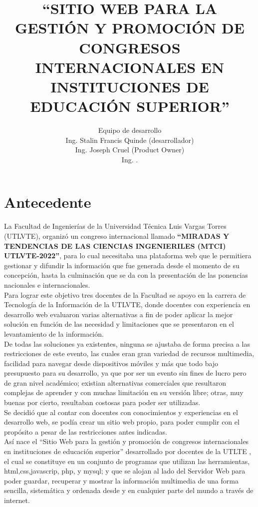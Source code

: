 \documentclass[a4paper,14px]{article}
\title{``SITIO WEB PARA LA GESTIÓN Y PROMOCIÓN DE CONGRESOS INTERNACIONALES EN INSTITUCIONES DE EDUCACIÓN SUPERIOR''}
\author{Equipo de desarrollo \\ Ing. Stalin Francis Quinde (desarrollador) \\ Ing. Joseph Cruel (Product Owner) \\ Ing. . }
\begin{document}
\maketitle

\section{Antecedente}
\label{sec:antecedente}
La Facultad de Ingenierías de la Universidad Técnica Luis Vargas Torres (UTLVTE), organizó un congreso internacional llamado \textbf{``MIRADAS Y TENDENCIAS  DE LAS CIENCIAS INGENIERILES (MTCI) UTLVTE-2022''}, para lo cual necesitaba una plataforma web que le permitiera gestionar y difundir la información que  fue generada desde el momento de su concepción, hasta la culminación que se da con la presentación de las ponencias nacionales e internacionales.\\

Para lograr este objetivo tres docentes de la Facultad se apoyo en la carrera de Tecnología de la Información de la UTLVTE, donde docentes con experiencia en desarrollo web evaluaron varias alternativas a fin de poder aplicar la mejor solución en función de las necesidad y limitaciones que se presentaron en el levantamiento de la información.\\

De todas las soluciones ya existentes, ninguna se ajustaba de forma precisa a las restricciones de este evento, las cuales eran  gran variedad de recursos multimedia, facilidad para navegar desde dispositivos móviles y  más que todo bajo presupuesto para su desarrollo, ya que por ser un evento sin fines de lucro pero de gran nivel académico; existian alternativas comerciales que resultaron complejas de aprender y con muchas limitación en su versión libre; otras, muy buenas por cierto, resultaban costosas para poder ser utilizadas.\\

Se decidió que al contar con docentes con conocimientos y experiencias en el desarrollo web,  se podía crear un  sitio web propio, para poder  cumplir con el propósito a pesar de las restricciones antes indicadas.\\

Así nace el  ``Sitio Web para la gestión y promoción de congresos internacionales en instituciones de educación superior'' desarrollado por docentes de la UTLTE , el cual se constituye en un  conjunto de programas que utilizan las  herramientas,  html,css,javascrip, php, y mysql; y que se alojan al lado del Servidor Web para poder guardar, recuperar y mostrar la información multimedia de una forma sencilla, sistemática y ordenada desde y en cualquier parte del mundo a través de internet.\\
\end{document}
